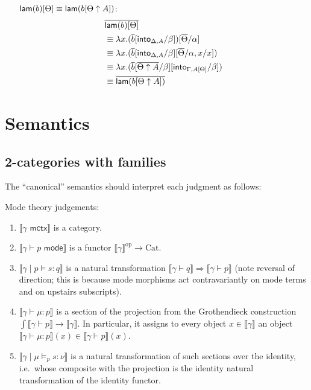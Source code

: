 \documentclass[10pt]{article}
\theoremstyle{definition}
\newcommand{\yields}{\vdash}
\newcommand{\ctx}{\,\,\mathsf{mctx}}
\newcommand{\type}{\,\,\mathsf{mode}}
\newcommand\UI[2]{\ensuremath{\lambda #1.#2}}
\newcommand\TypeTwo[4]{\ensuremath{#1 \mid #3 \vDash #2 : #4}}
\newcommand\TermTwoT[5]{\ensuremath{#1 \mid #3 \vDash_{#5} #2 : #4}}
\newcommand\mm[1]{\llbracket #1 \rrbracket}
\newcommand\op{^{\mathrm{op}}}
\newcommand\Cat{\mathrm{Cat}}
\begin{document}
\begin{enumerate}[style = multiline, labelwidth = 80pt]
\item[{$\mathsf{lam}(b)[\Theta] \equiv \mathsf{lam}(b[\Theta \uparrow A])$}:] 
\begin{align*}
&\upstairs{\qlam(b)[\Theta]} \\
&\equiv \UI{x}{(\upstairs{b}[\into{\Delta, A}/\beta])}[\upstairs{\Theta}/\alpha] \\
&\equiv \UI{x}{(\upstairs{b}[\into{\Delta, A}/\beta][\upstairs{\Theta}/\alpha, x / x])} \\
&\equiv \UI{x}{(\upstairs{b}[\upstairs{\Theta \uparrow A}/\beta][\into{\Gamma, A[\Theta]}/\beta])} \\
&\equiv \upstairs{\qlam(b[\Theta \uparrow A])}
\end{align*}
\end{enumerate}

\section{Semantics}
\label{sec:semantics}

\subsection{2-categories with families}
\label{sec:2cwfs}

The ``canonical'' semantics should interpret each judgment as follows:

Mode theory judgements:
\begin{enumerate}
\item $\mm{\gamma \ctx}$ is a category.
\item $\mm{\gamma \yields p \type}$ is a functor $\mm{\gamma}\op \to \Cat$.
\item $\mm{\TypeTwo{\gamma}{s}{p}{q}}$ is a natural transformation $\mm{\gamma \yields q} \Rightarrow \mm{\gamma \yields p}$ (note reversal of direction; this is because mode morphisms act contravariantly on mode terms and on upstairs subscripts).
\item $\mm{\gamma \yields \mu : p}$ is a section of the projection from the Grothendieck construction $\int\mm{\gamma\yields p} \to \mm{\gamma}$.
  In particular, it assigns to every object $x\in \mm{\gamma}$ an object $\mm{\gamma \yields \mu : p}(x)\in \mm{\gamma\yields p}(x)$.
\item $\mm{\TermTwoT{\gamma}{s}{\mu}{\nu}{p}}$ is a natural transformation of such sections over the identity, i.e.\ whose composite with the projection is the identity natural transformation of the identity functor.
\end{enumerate}
\end{document}
